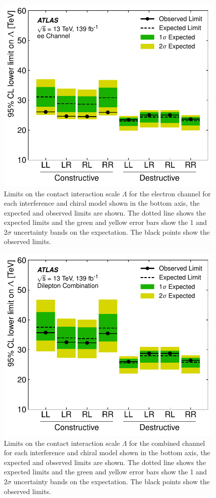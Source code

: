 \begin{figure}[htb]
\begin{center}
\includegraphics[width=0.5\linewidth]{figures/ci/results/fig_04b.pdf}
\end{center}
\vspace{-.4cm}
\caption{Limits on the contact interaction scale $\Lambda$ for the electron channel for each interference and chiral model shown in the bottom axis, the expected and observed limits are shown. The dotted line shows the expected limits and the green and yellow error bars show the 1 and $2\sigma$ uncertainty bands on the expectation. The black points show the observed limits.}
\label{fig:ciCiEeLimLambda}
\end{figure}

\begin{figure}[htb]
    \begin{center}
    \includegraphics[width=0.5\linewidth]{figures/ci/results/fig_04c.pdf}
    \end{center}
    \vspace{-.4cm}
    \caption{Limits on the contact interaction scale $\Lambda$ for the combined channel for each interference and chiral model shown in the bottom axis, the expected and observed limits are shown. The dotted line shows the expected limits and the green and yellow error bars show the 1 and $2\sigma$ uncertainty bands on the expectation. The black points show the observed limits.}
    \label{fig:ciCiLlLimLambda}
\end{figure}

